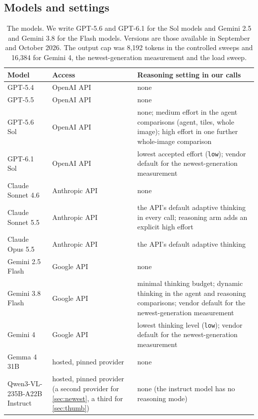 \subsection{Models and settings}
\label{sec:models}

\begin{table}[t]
\centering
\small
\begin{tabular}{p{3.3cm}p{3.0cm}p{8.4cm}}
\toprule
Model & Access & Reasoning setting in our calls \\
\midrule
GPT-5.4 & OpenAI API & none \\
GPT-5.5 & OpenAI API & none \\
GPT-5.6 Sol & OpenAI API & none; medium effort in the agent comparisons (agent, tiles, whole image); high effort in one further whole-image comparison \\
GPT-6.1 Sol & OpenAI API & lowest accepted effort (\texttt{low}); vendor default for the newest-generation measurement \\
Claude Sonnet 4.6 & Anthropic API & none \\
Claude Sonnet 5.5 & Anthropic API & the API's default adaptive thinking in every call; reasoning arm adds an explicit high effort \\
Claude Opus 5.5 & Anthropic API & the API's default adaptive thinking \\
Gemini 2.5 Flash & Google API & none \\
Gemini 3.8 Flash & Google API & minimal thinking budget; dynamic thinking in the agent and reasoning comparisons; vendor default for the newest-generation measurement \\
Gemini 4 & Google API & lowest thinking level (\texttt{low}); vendor default for the newest-generation measurement \\
Gemma 4 31B & hosted, pinned provider & none \\
Qwen3-VL-235B-A22B Instruct & hosted, pinned provider (a second provider for \cref{sec:newest}, a third for \cref{sec:thumb}) & none (the instruct model has no reasoning mode) \\
\bottomrule
\end{tabular}
\caption{The \CscaleModels{} models. We write GPT-5.6 and GPT-6.1 for the Sol models and Gemini 2.5 and Gemini 3.8 for the Flash models. Versions are those available in September and October 2026. The output cap was 8{,}192 tokens in the controlled sweeps and 16{,}384 for Gemini 4, the newest-generation measurement and the load sweep.}
\label{tab:models}
\end{table}

